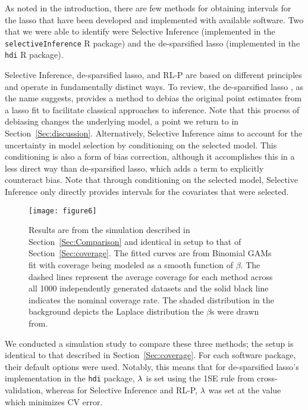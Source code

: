 As noted in the introduction, there are few methods for obtaining intervals for the lasso that have been developed and implemented with available software. Two that we were able to identify were Selective Inference (implemented in the \texttt{selectiveInference} R package) and the de-sparsified lasso (implemented in the \texttt{hdi} R package).

Selective Inference, de-sparsified lasso, and RL-P are based on different principles and operate in fundamentally distinct ways. To review, the de-sparsified lasso \citep{ZhangZhang2014}, as the name suggests, provides a method to debias the original point estimates from a lasso fit to facilitate classical approaches to inference. Note that this process of debiasing changes the underlying model, a point we return to in Section~\ref{Sec:discussion}. Alternatively, Selective Inference \citep{Lee2016,Tibshirani2016} aims to account for the uncertainty in model selection by conditioning on the selected model. This conditioning is also a form of bias correction, although it accomplishes this in a less direct way than de-sparsified lasso, which adds a term to explicitly counteract bias. Note that through conditioning on the selected model, Selective Inference only directly provides intervals for the covariates that were selected.

\begin{figure}[htb!]
  \begin{center}
    \texttt{[image: figure6]}
    \caption{\label{Fig:laplace_comparison} Results are from the simulation described in Section~\ref{Sec:Comparison} and identical in setup to that of Section~\ref{Sec:coverage}. The fitted curves are from Binomial GAMs fit with coverage being modeled as a smooth function of $\beta$. The dashed lines represent the average coverage for each method across all 1000 independently generated datasets and the solid black line indicates the nominal coverage rate. The shaded distribution in the background depicts the Laplace distribution the $\beta$s were drawn from.}
  \end{center}
\end{figure}

We conducted a simulation study to compare these three methods; the setup is identical to that described in Section~\ref{Sec:coverage}. For each software package, their default options were used. Notably, this means that for de-sparsified lasso's implementation in the \texttt{hdi} package, $\lambda$ is set using the 1SE rule from cross-validation, whereas for Selective Inference and RL-P, $\lambda$ was set at the value which minimizes CV error.

